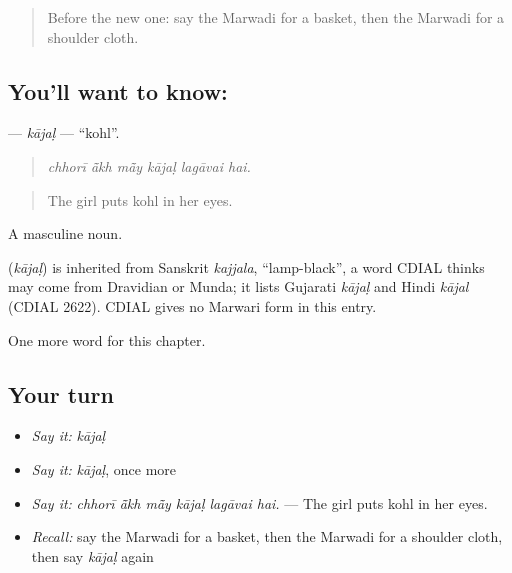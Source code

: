 \begin{quote}
Before the new one: say the Marwadi for a basket, then the Marwadi for a shoulder cloth.
\end{quote}

\subsection*{You'll want to know: }
\textbf{} — \emph{kājaḷ} — \textquotedblleft{}kohl\textquotedblright{}.

\begin{quote}
     
\end{quote}

\begin{quote}
\emph{chhorī ā̃kh mā̃y kājaḷ lagāvai hai.}
\end{quote}

\begin{quote}
The girl puts kohl in her eyes.
\end{quote}

A masculine noun.

\begin{cousinweb}
\textbf{} (\emph{kājaḷ}) is inherited from Sanskrit \emph{kajjala}, \textquotedblleft{}lamp-black\textquotedblright{}, a word CDIAL thinks may come from Dravidian or Munda; it lists Gujarati \emph{kājaḷ} and Hindi \emph{kājal} (CDIAL 2622). CDIAL gives no Marwari form in this entry.
\end{cousinweb}

\begin{grammarlens}[title={What you've built}]
One more word for this chapter.
\end{grammarlens}

\subsection*{Your turn}
\begin{itemize}
\raggedright
  \item \emph{Say it:} \emph{kājaḷ}
  \item \emph{Say it:} \emph{kājaḷ}, once more
  \item \emph{Say it:} \emph{chhorī ā̃kh mā̃y kājaḷ lagāvai hai.} — The girl puts kohl in her eyes.
  \item \emph{Recall:} say the Marwadi for a basket, then the Marwadi for a shoulder cloth, then say \emph{kājaḷ} again
\end{itemize}

